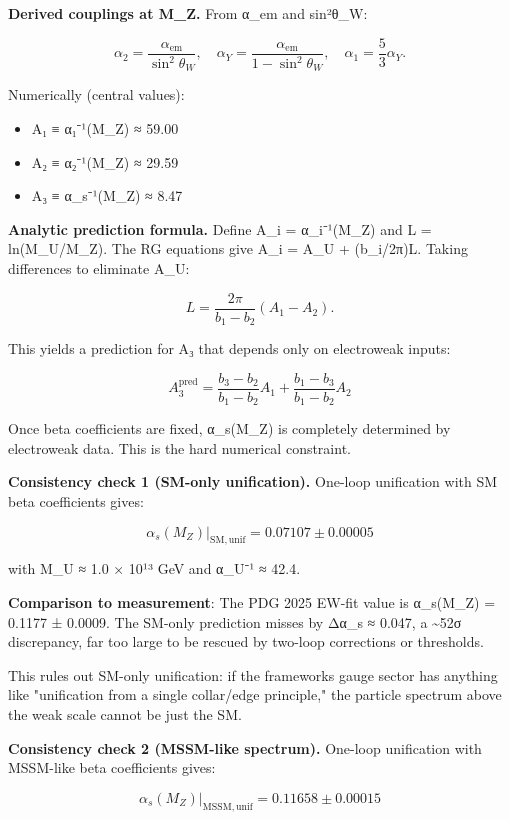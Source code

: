\textbf{Derived couplings at M\_Z.} From α\_em and sin²θ\_W:

\[
\alpha_2 = \frac{\alpha_{\mathrm{em}}}{\sin^2\theta_W}, \quad
\alpha_Y = \frac{\alpha_{\mathrm{em}}}{1 - \sin^2\theta_W}, \quad
\alpha_1 = \frac{5}{3}\alpha_Y.
\]

Numerically (central values):

\begin{itemize}
\tightlist
\item
  A₁ ≡ α₁⁻¹(M\_Z) ≈ 59.00
\item
  A₂ ≡ α₂⁻¹(M\_Z) ≈ 29.59
\item
  A₃ ≡ α\_s⁻¹(M\_Z) ≈ 8.47
\end{itemize}

\textbf{Analytic prediction formula.} Define A\_i = α\_i⁻¹(M\_Z) and L = ln(M\_U/M\_Z). The RG equations give A\_i = A\_U + (b\_i/2π)L. Taking differences to eliminate A\_U:

\[
L = \frac{2\pi}{b_1 - b_2}(A_1 - A_2).
\]

This yields a prediction for A₃ that depends only on electroweak inputs:

\[
A_3^\mathrm{pred} = \frac{b_3 - b_2}{b_1 - b_2} A_1 + \frac{b_1 - b_3}{b_1 - b_2} A_2
\]

Once beta coefficients are fixed, α\_s(M\_Z) is completely determined by electroweak data. This is the hard numerical constraint.

\textbf{Consistency check 1 (SM-only unification).} One-loop unification with SM beta coefficients gives:

\[
\alpha_s(M_Z)|_\mathrm{SM,unif} = 0.07107 \pm 0.00005
\]

with M\_U ≈ 1.0 × 10¹³ GeV and α\_U⁻¹ ≈ 42.4.

\textbf{Comparison to measurement}: The PDG 2025 EW-fit value is α\_s(M\_Z) = 0.1177 ± 0.0009. The SM-only prediction misses by Δα\_s ≈ 0.047, a \textasciitilde52σ discrepancy, far too large to be rescued by two-loop corrections or thresholds.

This rules out SM-only unification: if the framework\textquotesingle s gauge sector has anything like "unification from a single collar/edge principle," the particle spectrum above the weak scale cannot be just the SM.

\textbf{Consistency check 2 (MSSM-like spectrum).} One-loop unification with MSSM-like beta coefficients gives:

\[
\alpha_s(M_Z)|_\mathrm{MSSM,unif} = 0.11658 \pm 0.00015
\]


